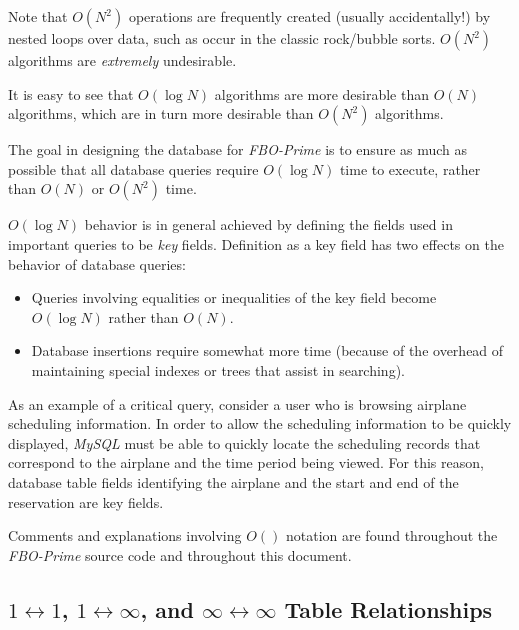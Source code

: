 \documentclass[letterpaper,10pt,titlepage]{article}
\newcommand{\productbasename}{FBO-Prime}
\begin{document}
Note that $O(N^2)$ operations are frequently created (usually accidentally!) by
nested loops over data, such as occur in the classic rock/bubble sorts.
$O(N^2)$ algorithms are \emph{extremely} undesirable.

It is easy to see that $O(\log N)$ algorithms are more 
desirable than $O(N)$ algorithms, which are in
turn more desirable than $O(N^2)$ algorithms.

The goal in designing the database for \emph{\productbasename{}} is to ensure as much
as possible that all database queries require $O(\log N)$ time to execute, rather
than $O(N)$ or $O(N^2)$ time.

$O(\log N)$ behavior is in general achieved by defining the fields used in important
queries to be 
\emph{key} fields.  
Definition as a key field has two effects on
the behavior of database queries:

\begin{itemize}
\item Queries involving equalities or inequalities of the key field become
      $O(\log N)$ rather than $O(N)$.
\item Database insertions require somewhat more time (because of the overhead
      of maintaining special indexes or trees that assist in searching).
\end{itemize}

As an example of a critical query, consider a user who is browsing airplane
scheduling information.  In order to allow the scheduling information to be quickly
displayed,
\emph{MySQL} must be able to quickly locate the scheduling records that
correspond to the airplane and the time period being viewed.  For this reason,
database table fields identifying the airplane 
and the start and end of the reservation are
key fields.

Comments and explanations involving $O()$ notation are found throughout the
\emph{\productbasename{}} source code and throughout this document. 



\subsection[\mbox{\protect$1\leftrightarrow{}1$}, 
            \mbox{\protect$1\leftrightarrow{}\infty{}$}, 
            and 
            \mbox{\protect$\infty\leftrightarrow\infty{}$} Table Relationships]
           {\mbox{\protect\boldmath$1\leftrightarrow{}1$}, 
            \mbox{\protect\boldmath$1\leftrightarrow{}\infty{}$}, 
            and 
            \mbox{\protect\boldmath$\infty\leftrightarrow\infty{}$} Table Relationships}
\label{stbg0:sdbx0}
\end{document}
